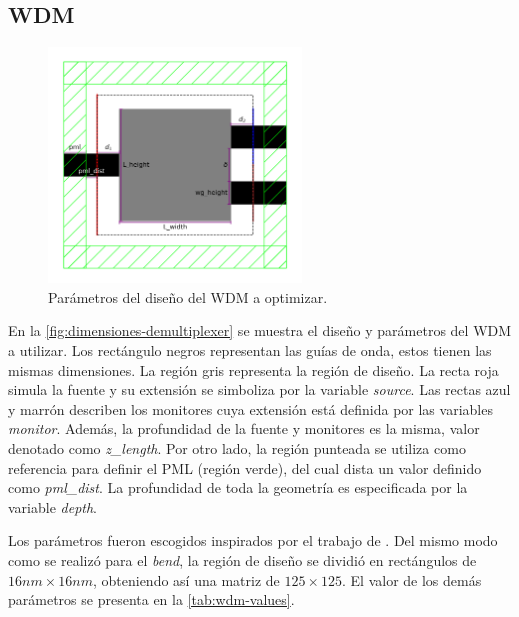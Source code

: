 \subsection{WDM}

\begin{figure}[ht]
  \centering
  \includegraphics[width=0.6\textwidth]{image/proposal/wdm.png}
  \caption{Parámetros del diseño del WDM a optimizar.}
  \label{fig:dimensiones-demultiplexer}
\end{figure}

En la \autoref{fig:dimensiones-demultiplexer} se muestra el diseño y parámetros del WDM a utilizar.
Los rectángulo negros representan las guías de onda, estos tienen las mismas dimensiones.
La región gris representa la región de diseño.
La recta roja simula la fuente y su extensión se simboliza por la variable \emph{source}.
Las rectas azul y marrón describen los monitores cuya extensión está definida por las variables \emph{monitor}.
Además, la profundidad de la fuente y monitores es la misma, valor denotado como \emph{z\_length}.
Por otro lado, la región punteada se utiliza como referencia para definir el PML (región verde),
del cual dista un valor definido como \emph{pml\_dist}.
La profundidad de toda la geometría es especificada por la variable \emph{depth}.

Los parámetros fueron escogidos inspirados por el trabajo de \cite{Christiansen2021}.
Del mismo modo como se realizó para el \emph{bend}, 
la región de diseño se dividió en rectángulos de $16nm \times 16 nm$, obteniendo así una
matriz de $125 \times 125$.
El valor de los demás parámetros se presenta en la \autoref{tab:wdm-values}.

